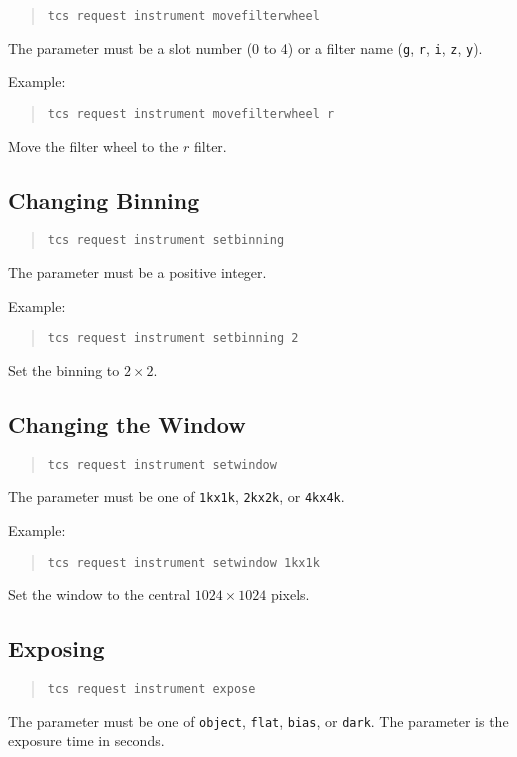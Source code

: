 \begin{quote}
\verb|tcs request instrument movefilterwheel| 
\end{quote}
The  parameter must be a slot number (0 to 4) or a filter name (\verb|g|, \verb|r|, \verb|i|, \verb|z|, \verb|y|).

Example:

\begin{quote}
\verb|tcs request instrument movefilterwheel r| 
\end{quote}
Move the filter wheel to the $r$ filter.

\subsection{Changing Binning}

\begin{quote}
\verb|tcs request instrument setbinning| 
\end{quote}
The  parameter must be a positive integer.

Example:

\begin{quote}
\verb|tcs request instrument setbinning 2|
\end{quote}
Set the binning to $2\times2$.

\subsection{Changing the Window}

\begin{quote}
\verb|tcs request instrument setwindow| 
\end{quote}
The  parameter must be one of \verb|1kx1k|, \verb|2kx2k|, or \verb|4kx4k|.

Example:

\begin{quote}
\verb|tcs request instrument setwindow 1kx1k|
\end{quote}
Set the window to the central $1024 \times 1024$ pixels.

\subsection{Exposing}

\begin{quote}
\verb|tcs request instrument expose|  
\end{quote}
The  parameter must be one of \verb|object|, \verb|flat|, \verb|bias|, or \verb|dark|. The  parameter is the exposure time in seconds. 

